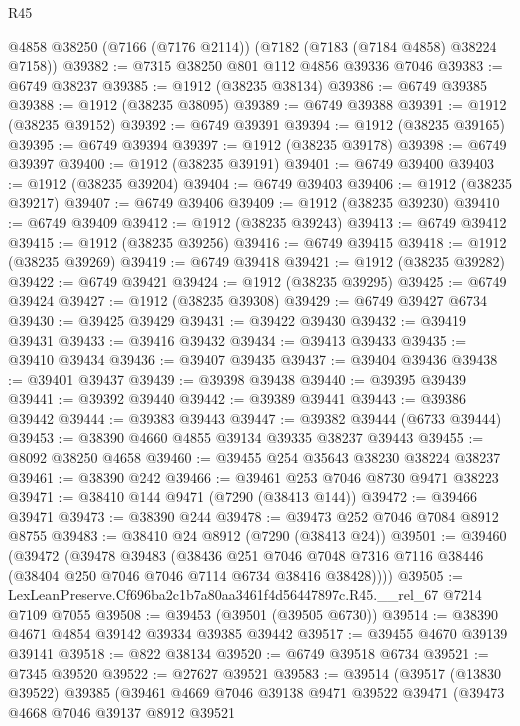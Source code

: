 \begin{lexlean}{R45}
\begin{coremodule}
{    @4858
    @38250
    (@7166 (@7176 @2114))
    (@7182 (@7183 (@7184 @4858) @38224 @7158))
@39382 := @7315 @38250 @801 @112 @4856 @39336 @7046
@39383 := @6749 @38237
@39385 := @1912 (@38235 @38134)
@39386 := @6749 @39385
@39388 := @1912 (@38235 @38095)
@39389 := @6749 @39388
@39391 := @1912 (@38235 @39152)
@39392 := @6749 @39391
@39394 := @1912 (@38235 @39165)
@39395 := @6749 @39394
@39397 := @1912 (@38235 @39178)
@39398 := @6749 @39397
@39400 := @1912 (@38235 @39191)
@39401 := @6749 @39400
@39403 := @1912 (@38235 @39204)
@39404 := @6749 @39403
@39406 := @1912 (@38235 @39217)
@39407 := @6749 @39406
@39409 := @1912 (@38235 @39230)
@39410 := @6749 @39409
@39412 := @1912 (@38235 @39243)
@39413 := @6749 @39412
@39415 := @1912 (@38235 @39256)
@39416 := @6749 @39415
@39418 := @1912 (@38235 @39269)
@39419 := @6749 @39418
@39421 := @1912 (@38235 @39282)
@39422 := @6749 @39421
@39424 := @1912 (@38235 @39295)
@39425 := @6749 @39424
@39427 := @1912 (@38235 @39308)
@39429 := @6749 @39427 @6734
@39430 := @39425 @39429
@39431 := @39422 @39430
@39432 := @39419 @39431
@39433 := @39416 @39432
@39434 := @39413 @39433
@39435 := @39410 @39434
@39436 := @39407 @39435
@39437 := @39404 @39436
@39438 := @39401 @39437
@39439 := @39398 @39438
@39440 := @39395 @39439
@39441 := @39392 @39440
@39442 := @39389 @39441
@39443 := @39386 @39442
@39444 := @39383 @39443
@39447 := @39382 @39444 (@6733 @39444)
@39453 := @38390 @4660 @4855 @39134 @39335 @38237 @39443
@39455 := @8092 @38250 @4658
@39460 := @39455 @254 @35643 @38230 @38224 @38237
@39461 := @38390 @242
@39466 := @39461 @253 @7046 @8730 @9471 @38223
@39471 := @38410 @144 @9471 (@7290 (@38413 @144))
@39472 := @39466 @39471
@39473 := @38390 @244
@39478 := @39473 @252 @7046 @7084 @8912 @8755
@39483 := @38410 @24 @8912 (@7290 (@38413 @24))
@39501 := @39460
    (@39472
      (@39478
        @39483
        (@38436
          @251
          @7046
          @7048
          @7316
          @7116
          @38446
          (@38404 @250 @7046 @7046 @7114 @6734 @38416 @38428))))
@39505 := LexLeanPreserve.Cf696ba2c1b7a80aa3461f4d56447897c.R45.__rel_67 @7214 @7109 @7055
@39508 := @39453 (@39501 (@39505 @6730))
@39514 := @38390 @4671 @4854 @39142 @39334 @39385 @39442
@39517 := @39455 @4670 @39139 @39141
@39518 := @822 @38134
@39520 := @6749 @39518 @6734
@39521 := @7345 @39520
@39522 := @27627 @39521
@39583 := @39514
    (@39517
      (@13830 @39522)
      @39385
      (@39461
        @4669
        @7046
        @39138
        @9471
        @39522
        @39471
        (@39473
          @4668
          @7046
          @39137
          @8912
          @39521
}
\end{coremodule}
\end{lexlean}
